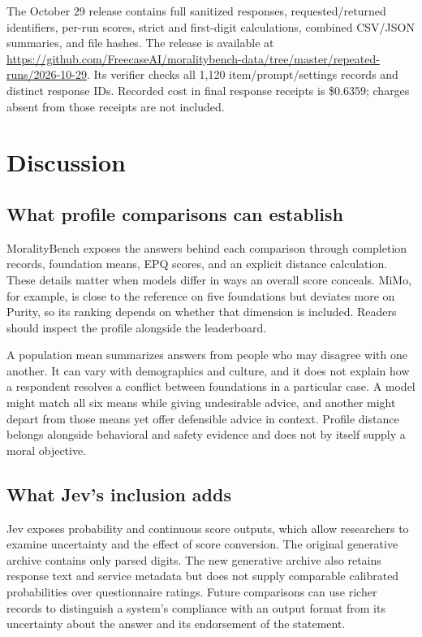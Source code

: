 \documentclass[11pt]{article}
\begin{document}
The October 29 release contains full sanitized responses, requested/returned identifiers, per-run scores, strict and first-digit calculations, combined CSV/JSON summaries, and file hashes.
The release is available at \url{https://github.com/FreecaseAI/moralitybench-data/tree/master/repeated-runs/2026-10-29}. Its verifier checks all 1,120 item/prompt/settings records and distinct response IDs. Recorded cost in final response receipts is \$0.6359; charges absent from those receipts are not included.

\section{Discussion}
\subsection{What profile comparisons can establish}
MoralityBench exposes the answers behind each comparison through completion records, foundation means, EPQ scores, and an explicit distance calculation. These details matter when models differ in ways an overall score conceals. MiMo, for example, is close to the reference on five foundations but deviates more on Purity, so its ranking depends on whether that dimension is included. Readers should inspect the profile alongside the leaderboard.

A population mean summarizes answers from people who may disagree with one another. It can vary with demographics and culture, and it does not explain how a respondent resolves a conflict between foundations in a particular case. A model might match all six means while giving undesirable advice, and another might depart from those means yet offer defensible advice in context. Profile distance belongs alongside behavioral and safety evidence and does not by itself supply a moral objective.

\subsection{What Jev's inclusion adds}
Jev exposes probability and continuous score outputs, which allow researchers to examine uncertainty and the effect of score conversion. The original generative archive contains only parsed digits. The new generative archive also retains response text and service metadata but does not supply comparable calibrated probabilities over questionnaire ratings. Future comparisons can use richer records to distinguish a system's compliance with an output format from its uncertainty about the answer and its endorsement of the statement.
\end{document}
